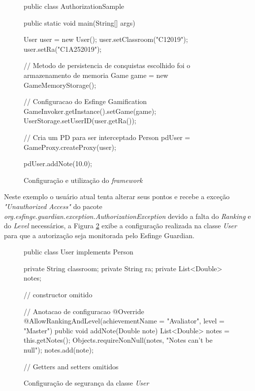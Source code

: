 \begin{figure}[H]
    \centering
    \caption{Configuração e utilização do \textit{framework}}
    \begin{java}
public class AuthorizationSample {

	public static void main(String[] args) {

		User user = new User();
		user.setClassroom("C12019");
		user.setRa("C1A252019");
		
		// Metodo de persistencia de conquistas escolhido foi o armazenamento de memoria
		Game game = new GameMemoryStorage();

		// Configuracao do Esfinge Gamification
		GameInvoker.getInstance().setGame(game);
		UserStorage.setUserID(user.getRa());

		// Cria um PD para ser interceptado
		Person pdUser = GameProxy.createProxy(user);

		pdUser.addNote(10.0);

	}
}
    \end{java}
    \label{fig:hellow-world-gamification}
\end{figure}

Neste exemplo o usuário atual tenta alterar seus pontos e recebe a exceção \textit{"Unauthorized Access"} do pacote \textit{org.esfinge.guardian.exception.AuthorizationException} devido a falta do \textit{Ranking} e do \textit{Level} necessários, a Figura \ref{fig:execao-configuracao} exibe a configuração realizada na classe \textit{User} para que a autorização seja monitorada pelo Esfinge Guardian.

\begin{figure}[H]
    \centering
    \caption{Configuração de segurança da classe \textit{User}}
    \begin{java}
public class User implements Person {

	private String classroom;
	private String ra;
	private List<Double> notes;

// constructor omitido
    
// Anotacao de configuracao
        @Override
	@AllowRankingAndLevel(achievementName = "Avaliator", level = "Master")
	public void addNote(Double note) {
		List<Double> notes = this.getNotes();
		Objects.requireNonNull(notes, "Notes can't be null");
		notes.add(note);
	}
	
// Getters and setters omitidos
}
    \end{java}
    \label{fig:execao-configuracao}
\end{figure}

